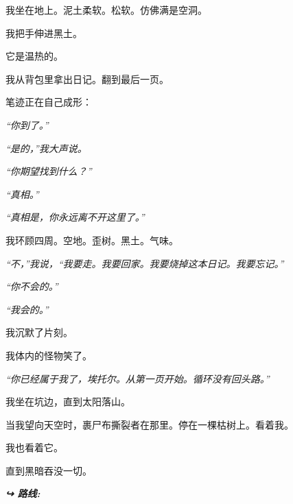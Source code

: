 \noindent 我坐在地上。泥土柔软。松软。仿佛满是空洞。

\noindent 我把手伸进黑土。

\noindent 它是温热的。

\noindent 我从背包里拿出日记。翻到最后一页。

\noindent 笔迹正在自己成形：

\noindent \textit{“你到了。”}

\noindent \textit{“是的，”我大声说。}

\noindent \textit{“你期望找到什么？”}

\noindent \textit{“真相。”}

\noindent \textit{“真相是，你永远离不开这里了。”}

\noindent 我环顾四周。空地。歪树。黑土。气味。

\noindent \textit{“不，”我说，“我要走。我要回家。我要烧掉这本日记。我要忘记。”}

\noindent \textit{“你不会的。”}

\noindent \textit{“我会的。”}

\noindent 我沉默了片刻。

\noindent 我体内的怪物笑了。

\noindent \textit{“你已经属于我了，埃托尔。从第一页开始。循环没有回头路。”}

\noindent 我坐在坑边，直到太阳落山。

\noindent 当我望向天空时，裹尸布撕裂者在那里。停在一棵枯树上。看着我。

\noindent 我也看着它。

\noindent 直到黑暗吞没一切。

\vspace{0.5em}
\noindent\textit{\textbf{↪ 路线:}  \rotasep {}}
